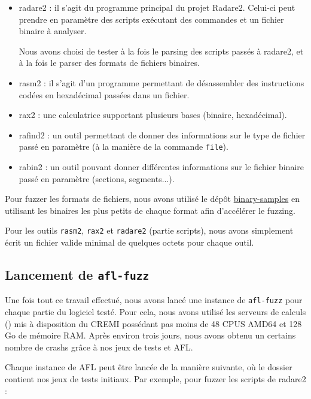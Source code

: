 \begin{itemize}
\item radare2 : il s'agit du programme principal du projet Radare2.
  Celui-ci peut prendre en paramètre des scripts exécutant des commandes et un fichier binaire à analyser.

  Nous avons choisi de tester à la fois le parsing des scripts passés à radare2, et à la fois le parser des formats de fichiers binaires.
\item rasm2 : il s'agit d'un programme permettant de désassembler des instructions codées en hexadécimal passées dans un fichier.
\item rax2 : une calculatrice supportant plusieurs bases (binaire, hexadécimal).
\item rafind2 : un outil permettant de donner des informations sur le type de fichier passé en paramètre (à la manière de la commande \lstinline{file}).
\item rabin2 : un outil pouvant donner différentes informations sur le fichier binaire passé en paramètre (sections, segments...).
\end{itemize}

Pour fuzzer les formats de fichiers, nous avons utilisé le dépôt \href{https://github.com/JonathanSalwan/binary-samples}{binary-samples} en utilisant les binaires les plus petits de chaque format afin d'accélérer le fuzzing.

Pour les outils \lstinline{rasm2}, \lstinline{rax2} et \lstinline{radare2} (partie scripts), nous avons simplement écrit un fichier valide minimal de quelques octets pour chaque outil.

\subsection{Lancement de \lstinline{afl-fuzz}}

Une fois tout ce travail effectué, nous avons lancé une instance de \lstinline{afl-fuzz} pour chaque partie du logiciel testé.
Pour cela, nous avons utilisé les serveurs de calculs () mis à disposition du CREMI possédant pas moins de 48 CPUS AMD64 et 128 Go de mémoire RAM.
Après environ trois jours, nous avons obtenu un certains nombre de crashs grâce à nos jeux de tests et AFL.

Chaque instance de AFL peut être lancée de la manière suivante, où le dossier  contient nos jeux de tests initiaux.
Par exemple, pour fuzzer les scripts de radare2 :

